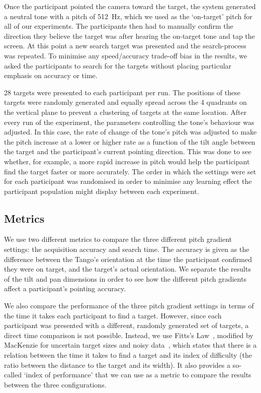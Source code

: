 \documentclass[sigconf, review=true, screen=true, anonymous=true]{acmart}
\begin{document}
Once the participant pointed the camera toward the target, the system generated a neutral tone with a pitch of \SI{512}{\hertz}, which we used as the `on-target' pitch for all of our experiments.
The participants then had to manually confirm the direction they believe the target was after hearing the on-target tone and tap the screen.
At this point a new search target was presented and the search-process was repeated.
To minimise any speed/accuracy trade-off bias in the results, we asked the participants to search for the targets without placing particular emphasis on accuracy or time. 

28 targets were presented to each participant per run.
The positions of these targets were randomly generated and equally spread across the 4 quadrants on the vertical plane to prevent a clustering of targets at the same location.
After every run of the experiment, the parameters controlling the tone's behaviour was adjusted.
In this case, the rate of change of the tone's pitch was adjusted to make the pitch increase at a lower or higher rate as a function of the tilt angle between the target and the participant's current pointing direction.
This was done to see whether, for example, a more rapid increase in pitch would help the participant find the target faster or more accurately.
The order in which the settings were set for each participant was randomised in order to minimise any learning effect the participant population might display between each experiment. 

\subsection{Metrics}

We use two different metrics to compare the three different pitch gradient settings: the acquisition accuracy and search time.
The accuracy is given as the difference between the Tango's orientation at the time the participant confirmed they were on target, and the target's actual orientation.
We separate the results of the tilt and pan dimensions in order to see how the different pitch gradients affect a participant's pointing accuracy. 

We also compare the performance of the three pitch gradient settings in terms of the time it takes each participant to find a target.
However, since each participant was presented with a different, randomly generated set of targets, a direct time comparison is not possible.
Instead, we use Fitts's Law~\cite{fitts1954information}, modified by MacKenzie for uncertain target sizes and noisy data~\cite{mackenzie1992fitts}, which states that there is a relation between the time it takes to find a target and its index of difficulty (the ratio between the distance to the target and its width).
It also provides a so-called `index of performance' that we can use as a metric to compare the results between the three configurations. 
\end{document}
